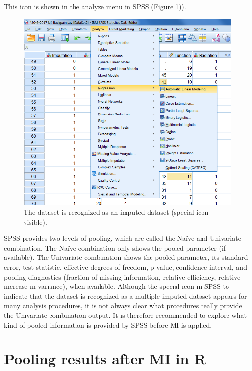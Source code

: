 \documentclass[]{book}
\theoremstyle{definition}
\theoremstyle{definition}
\theoremstyle{definition}
\theoremstyle{remark}
\begin{document}
This icon is shown in the analyze menu in SPSS (Figure
\ref{fig:fig5-4b})).

\begin{figure}

{\centering \includegraphics[width=0.9\linewidth]{images/fig5.4b} 

}

\caption{The dataset is recognized as an imputed dataset (special icon visible).}\label{fig:fig5-4b}
\end{figure}

SPSS provides two levels of pooling, which are called the Naïve and
Univariate combination. The Naïve combination only shows the pooled
parameter (if available). The Univariate combination shows the pooled
parameter, its standard error, test statistic, effective degrees of
freedom, p-value, confidence interval, and pooling diagnostics (fraction
of missing information, relative efficiency, relative increase in
variance), when available. Although the special icon in SPSS to indicate
that the dataset is recognized as a multiple imputed dataset appears for
many analysis procedures, it is not always clear what procedures really
provide the Univariate combination output. It is therefore recommended
to explore what kind of pooled information is provided by SPSS before MI
is applied.

\section{Pooling results after MI in
R}\label{pooling-results-after-mi-in-r}
\end{document}
